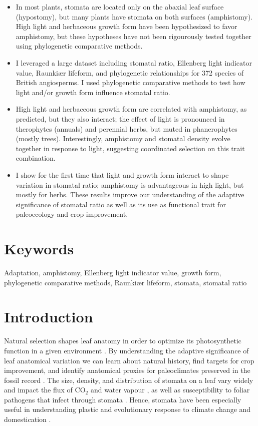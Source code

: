 \documentclass[12pt, oneside]{article}
\begin{document}
\begin{itemize}
	\item In most plants, stomata are located only on the abaxial leaf surface (hypostomy), but many plants have stomata on both surfaces (amphistomy). High light and herbaceous growth form have been hypothesized to favor amphistomy, but these hypotheses have not been rigourously tested together using phylogenetic comparative methods.
	\item I leveraged a large dataset including stomatal ratio, Ellenberg light indicator value, Raunki\ae r lifeform, and phylogenetic relationships for 372 species of British angiosperms. I used phylogenetic comparative methods to test how light and/or growth form influence stomatal ratio.
	\item High light and herbaceous growth form are correlated with amphistomy, as predicted, but they also interact; the effect of light is pronounced in therophytes (annuals) and perennial herbs, but muted in phanerophytes (mostly trees). Interestingly, amphistomy and stomatal density evolve together in response to light, suggesting coordinated selection on this trait combination.
	\item I show for the first time that light and growth form interact to shape variation in stomatal ratio; amphistomy is advantageous in high light, but mostly for herbs. These results improve our understanding of the adaptive significance of stomatal ratio as well as its use as functional trait for paleoecology and crop improvement.
\end{itemize}

\section*{Keywords}

Adaptation, amphistomy, Ellenberg light indicator value, growth form, phylogenetic comparative methods, Raunki\ae r lifeform, stomata, stomatal ratio

\section*{Introduction}

Natural selection shapes leaf anatomy in order to optimize its photosynthetic function in a given environment \citep{Haberlandt_1914, Givnish_1987, Smith_etal_1997}. By understanding the adaptive significance of leaf anatomical variation we can learn about natural history, find targets for crop improvement, and identify anatomical proxies for paleoclimates preserved in the fossil record \citep[e.g.][]{Wolfe_1971, Royer_2001, McElwain_Steinthorsdottir_2017}. The size, density, and distribution of stomata on a leaf vary widely and impact the flux of CO$_2$ and water vapour \citep[recently reviewed in][]{Sack_Buckley_2016}, as well as susceptibility to foliar pathogens that infect through stomata \citep{Mckown_etal_2014, Melotto_etal_2017}. Hence, stomata have been especially useful in understanding plastic and evolutionary response to climate change and domestication \citep{Woodward_1987, Beerling_Royer_2011, Milla_etal_2013}.
\end{document}
